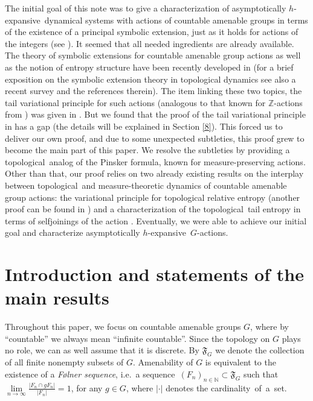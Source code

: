 \documentclass[12pt]{amsart}
\theoremstyle{definition}
\numberwithin{equation}{section}
\newcommand{\GF}{\mathfrak{F}}
\def \Z {\mathbb Z}
\def \sq {sequence}
\def \tl {topological}
\def \ahe {asympto\-ti\-cally $h$-ex\-pan\-sive}
\def \Z {\mathbb Z}
\def \sq {sequence}
\def \tl {topological}
\begin{document}
The initial goal of this note was to give a characterization of \ahe\ dynamical systems with actions of countable amenable groups in terms of the existence of a principal symbolic extension, just as it holds for actions of the integers (see \cite{D2005}). It seemed that all needed ingredients are already available. The theory of symbolic extensions for countable amenable group actions as well as the notion of entropy structure have been recently developed in \cite{DownarowiczZhang} (for a brief exposition on the symbolic extension theory in topological dynamics see also a recent survey \cite{DZ-survey} and the references therein). The item linking these two topics, the tail variational principle for such actions (analogous to that known for $\Z$-actions from \cite{D2005}) was given in \cite{Zhou}. But we found that the proof of the tail variational principle in \cite{Zhou} has a gap (the details will be explained in Section \ref{8}). This forced us to deliver our own proof, and due to some unexpected subtleties, this proof grew to become the main part of this paper. We resolve the subtleties by providing a \tl\ analog of the Pinsker formula, known for measure-preserving actions. Other than that, our proof relies on two already existing results on the interplay between \tl\ and measure-theoretic dynamics of countable amenable group actions: the variational principle for topological relative entropy \cite[Theorem 13.3]{DZ} (another proof can be found in \cite[Theorem 5.1]{Yan}) and a characterization of the \tl\ tail entropy in terms of selfjoinings of the action \cite[Theorem 3.1]{ZhouZhangChen}. Eventually, we were able to achieve our initial goal and characterize \ahe\ $G$-actions.

\section{Introduction and statements of the main results}\label{sI}

Throughout this paper, we focus on countable amenable groups $G$, where by ``countable'' we always mean ``infinite countable''. Since the topology on $G$ plays no role, we can as well assume that it is discrete. By $\GF_G$ we denote the collection of all finite nonempty subsets of $G$. Amenability of $G$ is equivalent to the existence of a \emph{F\o lner \sq}, i.e.\  a \sq\ $(F_n)_{n\in \mathbb{N}}\subset\GF_G$ such that $\lim\limits_{n\to\infty}\frac{|F_n\cap gF_n|}{|F_n|}=1$, for any $g\in G$, where  $|\cdot|$ denotes the cardinality~of~a~set. 
\end{document}
